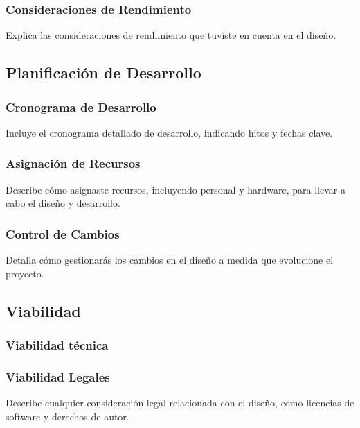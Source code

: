 \subsubsection{Consideraciones de Rendimiento}
Explica las consideraciones de rendimiento que tuviste en cuenta en el diseño.

\subsection{Planificación de Desarrollo}

\subsubsection{Cronograma de Desarrollo}
Incluye el cronograma detallado de desarrollo, indicando hitos y fechas clave.

\subsubsection{Asignación de Recursos}
Describe cómo asignaste recursos, incluyendo personal y hardware, para llevar a cabo el diseño y desarrollo.

\subsubsection{Control de Cambios}

Detalla cómo gestionarás los cambios en el diseño a medida que evolucione el proyecto.

\subsection{Viabilidad}

\subsubsection{Viabilidad técnica}

\subsubsection{Viabilidad Legales}
Describe cualquier consideración legal relacionada con el diseño, como licencias de software y derechos de autor.

